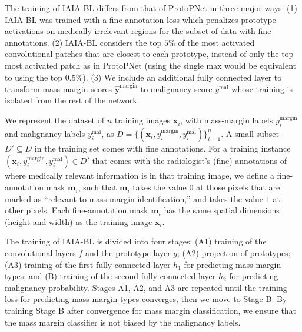 \documentclass[11pt]{article}
\begin{document}
The training of IAIA-BL differs from that of ProtoPNet \citep{PPNet} in three major ways: (1) IAIA-BL was trained with a fine-annotation loss which penalizes prototype activations on medically irrelevant regions for the subset of data with fine annotations. (2) IAIA-BL considers the top $5\%$ of the most activated convolutional patches that are closest to each prototype, instead of only the top most activated patch as in ProtoPNet (using the single max would be equivalent to using the top 0.5\%).
(3) We include an additional fully connected layer to transform mass margin scores $\hat{\mathbf{y}}^{\text{margin}}$ to malignancy score $y^{\text{mal}}$ whose training is isolated from the rest of the network. 

We represent the dataset of $n$ training images $\mathbf{x}_i$, with mass-margin labels $y^{\text{margin}}_i$ and malignancy labels $y_i^{\text{mal}}$, as $D=\{(\mathbf{x}_i, y^{\text{margin}}_i, y_i^{\text{mal}})\}_{i=1}^n$. A small subset $D' \subseteq D$ in the training set comes with fine annotations. For a training instance $(\mathbf{x}_i, y^{\text{margin}}_i, y_i^{\text{mal}}) \in D'$ that comes with the radiologist's (fine) annotations of where medically relevant information is in that training image, we define a fine-annotation mask $\textbf{m}_i$, such that $\textbf{m}_i$ takes the value $0$ at those pixels that are marked as ``relevant to mass margin identification,'' and takes the value $1$ at other pixels. Each fine-annotation mask $\textbf{m}_i$ has the same spatial dimensions (height and width) as the training image $\textbf{x}_i$.

The training of IAIA-BL is divided into four stages: (A1) training of the convolutional layers $f$ and the prototype layer $g$; (A2) projection of prototypes; (A3) training of the first fully connected layer $h_1$ for predicting mass-margin types; and (B) training of the second fully connected layer $h_2$ for predicting malignancy probability. Stages A1, A2, and A3 are repeated until the training loss for predicting mass-margin types converges, then we move to Stage B. By training Stage B after convergence for mass margin classification, we ensure that the mass margin classifier is not biased by the malignancy labels.
    
\end{document}
